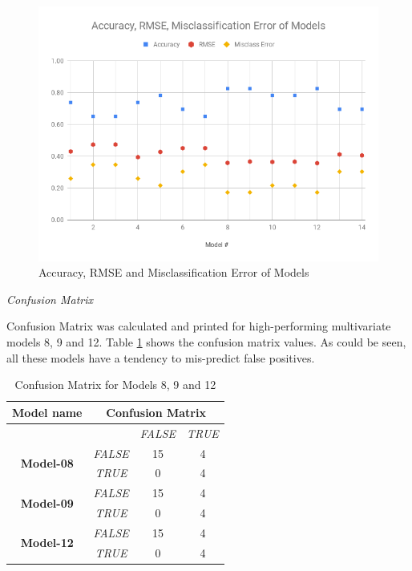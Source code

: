 \documentclass[11pt]{article}
\begin{document}
\begin{figure}[htbp]
\centering
\includegraphics[scale=0.5]{Accuracy-RMSE-MisclassError.png}
\caption{Accuracy, RMSE and Misclassification Error of Models}
\label{fig:AccuracyPlot}
\end{figure}

{\it Confusion Matrix}

Confusion Matrix was calculated and printed for high-performing multivariate models 8, 9 and 12. Table \ref{table:ConfusionMatrix} shows the confusion matrix values. As could be seen, all these models have a tendency to mis-predict false positives. 


\begin{table}[htbp]
\centering
\begin{tabular}{|c|c|c|c|}
\hline
\textbf{Model name}                & \multicolumn{3}{c|}{\textbf{Confusion Matrix}}  \\ \hline
                                   &                & \textit{FALSE} & \textit{TRUE} \\ \hline
\multirow{2}{*}{\textbf{Model-08}} & \textit{FALSE} & 15             & 4             \\ \cline{2-4} 
                                   & \textit{TRUE}  & 0              & 4             \\ \hline
\multirow{2}{*}{\textbf{Model-09}} & \textit{FALSE} & 15             & 4             \\ \cline{2-4} 
                                   & \textit{TRUE}  & 0              & 4             \\ \hline
\multirow{2}{*}{\textbf{Model-12}} & \textit{FALSE} & 15             & 4             \\ \cline{2-4} 
                                   & \textit{TRUE}  & 0              & 4             \\ \hline
\end{tabular}
\caption{Confusion Matrix for Models 8, 9 and 12}
\label{table:ConfusionMatrix}
\end{table}
\end{document}
